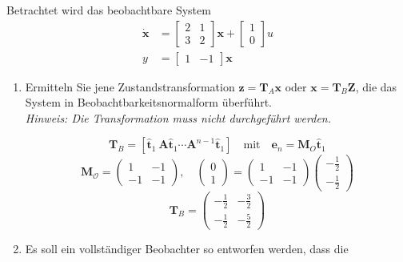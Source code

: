 \documentclass[crop=false]{standalone}
\begin{document}
\begin{task}
Betrachtet wird das beobachtbare System
\[ 
\begin{aligned} \dot{\mathbf{x}} &=\left[\begin{array}{ll}{2} & {1} \\ {3} & {2}\end{array}\right] \mathbf{x}+\left[\begin{array}{l}{1} \\ {0}\end{array}\right] u \\ y &=\left[\begin{array}{ll}{1} & {-1}\end{array}\right] \mathbf{x} \end{aligned}
 \]

 \begin{enumerate}[i]
     \item Ermitteln Sie jene Zustandstransformation $\mathbf{z}=\mathbf{T}_{A} \mathbf{x}$ oder $\mathbf{x}=\mathbf{T}_B \mathbf{Z}$,
die das System in Beobachtbarkeitsnormalform überführt.\\
\emph{Hinweis: Die Transformation muss nicht durchgeführt werden.}
     \begin{solution}
     \[ \mathbf{T}_{B} = \left[ \hat{\mathbf{t}}_1 \ \mathbf{A}\hat{\mathbf{t}}_1 \cdots \mathbf{A}^{n-1} \hat{\mathbf{t}}_1 \right] \quad \text{mit} \quad \mathbf{e}_{n}=\mathbf{M}_{O} \hat{\mathbf{t}}_{1} \]
      \[ \mathbf{M}_{\mathcal{O}} = \begin{pmatrix}
 1 & -1 \\ 
 -1 & -1
 \end{pmatrix},\quad \begin{pmatrix}
 0 \\ 1
 \end{pmatrix} =  \begin{pmatrix}
 1 & -1 \\
 -1 & -1
 \end{pmatrix}
 \begin{pmatrix}
 -\frac{1}{2} \\  -\frac{1}{2}
 \end{pmatrix}\]
 \[ \mathbf{T}_B = \begin{pmatrix}
 -\frac{1}{2} & -\frac{3}{2}\\
 -\frac{1}{2} & -\frac{5}{2}
 \end{pmatrix}\]
     \end{solution}
     \item Es soll ein vollständiger Beobachter so entworfen werden, dass die

\end{enumerate}
\end{task}
\end{document}
